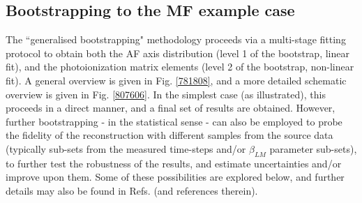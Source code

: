 \subsection{Bootstrapping to the MF example case\label{sec:bootstrapping}}


The ``generalised bootstrapping" methodology proceeds via a multi-stage fitting protocol to obtain both the AF axis distribution (level 1 of the bootstrap, linear fit), and the photoionization matrix elements (level 2 of the bootstrap, non-linear fit). A general overview is given in Fig. \ref{781808}, and a more detailed schematic overview is given in Fig. \ref{807606}. In the simplest case (as illustrated), this proceeds in a direct manner, and a final set of results are obtained. However, further bootstrapping - in the statistical sense - can also be employed to probe the fidelity of the reconstruction with different samples from the source data (typically sub-sets from the measured time-steps and/or $\beta_{LM}$ parameter sub-sets), to further test the robustness of the results, and estimate uncertainties and/or improve upon them. Some of these possibilities are explored below, and further details may also be found in Refs. \cite{hockett2018QMP1,hockett2018QMP2,marceau2017MolecularFrameReconstruction} (and references therein).


